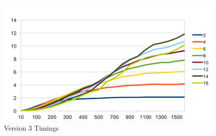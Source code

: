 \documentclass{report}
\begin{document}
\begin{figure}[h]
\includegraphics[width=1\textwidth]{V3-Speedup}
\caption{Version 3 Timings}
\label{fig:subim6}
\end{figure}
\end{document}
